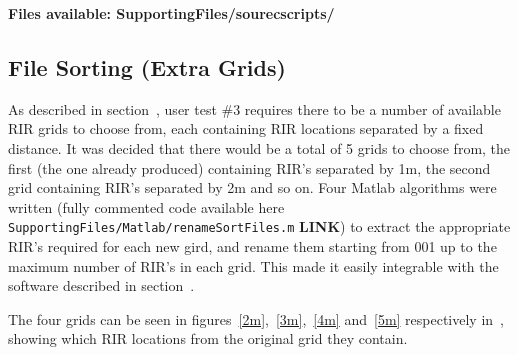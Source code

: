 \documentclass[../../main.tex]{subfiles}
\begin{document}
			\textbf{Files available: SupportingFiles/sourecscripts/}

	\subsection{File Sorting (Extra Grids)}
	\label{odeon:grids}
		As described in section~, user test \#3 requires there to be a number of available \ac{RIR} grids to choose from, each containing \ac{RIR} locations separated by a fixed distance. It was decided that there would be a total of 5 grids to choose from, the first (the one already produced) containing \ac{RIR}'s separated by 1m, the second grid containing \ac{RIR}'s separated by 2m and so on.	 Four Matlab algorithms were written (fully commented code available here \texttt{SupportingFiles/Matlab/renameSortFiles.m} \textbf{LINK}) to extract the appropriate \ac{RIR}'s required for each new gird, and rename them starting from 001 up to the maximum number of \ac{RIR}'s in each grid. This made it easily  integrable with the software described in section~.

		The four grids can be seen in figures~\ref{2m},~\ref{3m},~\ref{4m} and~\ref{5m} respectively in~, showing which \ac{RIR} locations from the original grid they contain.

	
\end{document}
